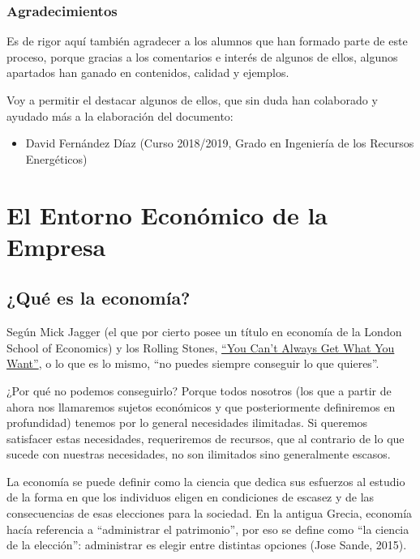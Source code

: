 \documentclass[
]{krantz}
\providecommand{\tightlist}{%
  \setlength{\itemsep}{0pt}\setlength{\parskip}{0pt}}
\begin{document}
\hypertarget{agradecimientos}{%
\section*{Agradecimientos}\label{agradecimientos}}


Es de rigor aquí también agradecer a los alumnos que han formado parte de este proceso, porque gracias a los comentarios e interés de algunos de ellos, algunos apartados han ganado en contenidos, calidad y ejemplos.

Voy a permitir el destacar algunos de ellos, que sin duda han colaborado y ayudado más a la elaboración del documento:

\begin{itemize}
\tightlist
\item
  David Fernández Díaz (Curso 2018/2019, Grado en Ingeniería de los Recursos Energéticos)
\end{itemize}

\mainmatter

\hypertarget{part-el-entorno-econuxf3mico-de-la-empresa}{%
\part{El Entorno Económico de la Empresa}\label{part-el-entorno-econuxf3mico-de-la-empresa}}

\hypertarget{quuxe9-es-la-economuxeda}{%
\chapter{¿Qué es la economía?}\label{quuxe9-es-la-economuxeda}}

Según Mick Jagger (el que por cierto posee un título en economía de la London School of Economics) y los Rolling Stones, \href{https://www.youtube.com/watch?v=oqMl5CRoFdk}{``You Can't Always Get What You Want''}, o lo que es lo mismo, ``no puedes siempre conseguir lo que quieres''.

¿Por qué no podemos conseguirlo? Porque todos nosotros (los que a partir de ahora nos llamaremos sujetos económicos y que posteriormente definiremos en profundidad) tenemos por lo general necesidades ilimitadas. Si queremos satisfacer estas necesidades, requeriremos de recursos, que al contrario de lo que sucede con nuestras necesidades, no son ilimitados sino generalmente escasos.

La economía se puede definir como la ciencia que dedica sus esfuerzos al estudio de la forma en que los individuos eligen en condiciones de escasez y de las consecuencias de esas elecciones para la sociedad. En la antigua Grecia, economía hacía referencia a ``administrar el patrimonio'', por eso se define como ``la ciencia de la elección'': administrar es elegir entre distintas opciones (Jose Sande, 2015).
\end{document}
